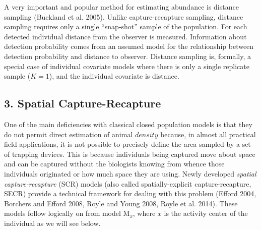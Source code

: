 \documentclass{book}
\begin{document}
A very important and popular method for
estimating abundance is distance sampling (Buckland et
al. 2005). Unlike capture-recapture sampling, distance sampling
requires only a single ``snap-shot'' sample of the population. For
each detected individual distance from the observer is
measured. Information about detection probability comes from an
assumed model for the relationship between detection probability and
distance to observer. Distance sampling is, formally, a special case
of individual covariate models where there is only a single replicate
sample ($K=1$), and the individual covariate is distance.

\subsection*{3. Spatial Capture-Recapture}

One of the main deficiencies with classical closed population models
is that they do not permit direct estimation of animal $density$
because, in almost all practical field applications, it is not
possible to precisely define the area sampled by a set of trapping
devices. This is because individuals being captured move about space
and can be captured without the biologists knowing from whence those
individuals originated or how much space they are using. Newly
developed {\it spatial capture-recapture} (SCR) models (also called
spatially-explicit capture-recapture, SECR) provide a technical
framework for dealing with this problem (Efford 2004, Borchers and
Efford 2008, Royle and Young 2008, Royle et al. 2014). These models
follow logically on from model M$_x$, where $x$ is the activity center
of the individual as we will see below.
\end{document}
